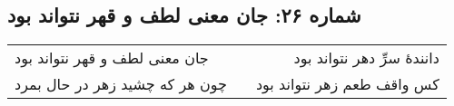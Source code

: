 \begin{center}
\section*{شماره ۲۶: جان معنی لطف و قهر نتواند بود}
\label{sec:026}
\begin{longtable}{l p{0.5cm} r}
جان معنی لطف و قهر نتواند بود
&&
دانندهٔ سرِّ دهر نتواند بود
\\
چون هر که چشید زهر در حال بمرد
&&
کس واقف طعم زهر نتواند بود
\\
\end{longtable}
\end{center}
